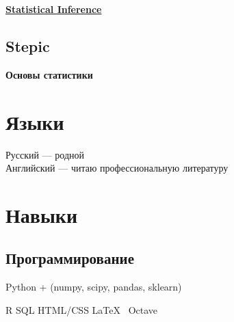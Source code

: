 \documentclass[a4paper]{resume}
\begin{document}
\begin{minipage}[t]{0.35\textwidth} {\Large }
\begin{tightitemize}
	\item \href{https://www.coursera.org/maestro/api/certificate/get_certificate?course_id=973518}{\bf Statistical Inference}
\end{tightitemize}

\subsection{Stepic}
\vspace{\topsep}
\begin{tightitemize}
	\item {\bf Основы статистики}
\end{tightitemize}



\sectionspace 
\section{Языки}
\large{Русский} — родной \\
\large{Английский} — читаю профессиональную литературу
\sectionspace 


\section{Навыки}

\subsection{Программирование}

Python + (numpy, scipy, pandas, sklearn)

R \textbullet{} SQL \textbullet{} HTML/CSS \textbullet{} \LaTeX\ \textbullet{} Octave


\end{minipage}
\end{document}
